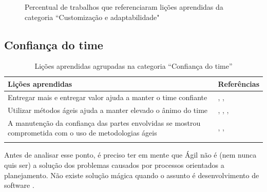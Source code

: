 \begin{figure}[H]
	\centering
	\captionsetup{justification=centering}
	\caption{Percentual de trabalhos que referenciaram lições aprendidas da categoria ``Customização e adaptabilidade"}
	\label{fig:adaptabilidade}
\end{figure}

\subsection{Confiança do time}

\begin{table}[H]
	\centering
	\captionsetup{justification=centering}
	\begin{tabularx}{\linewidth}{ | X | p{5cm} | } \hline \textbf{Lições aprendidas} & \textbf{Referências} \\ \hline
		Entregar mais e entregar valor  ajuda a manter o time confiante & \cite{Block2011}, \cite{Asnawi2012}, \cite{Parzinello2012} \\ \hline
		Utilizar métodos ágeis ajuda a manter elevado o ânimo do time & \cite{Asnawi2012}, \cite{Claudia2013}, \cite{Nokia2013}, \cite{Ahmed2008} \\ \hline
		A manutenção da confiança das partes envolvidas se mostrou comprometida com o uso de metodologias ágeis & \cite{Nokia2013}, \cite{Piegas2012}, \cite{Bastos2013} \\ \hline
	\caption{Lições aprendidas agrupadas na categoria ``Confiança do time''}
	\end{tabularx}
\end{table}

Antes de analisar esse ponto, é preciso ter em mente que Ágil não é (nem nunca quis ser) a solução dos problemas causados por processos orientados a planejamento. Não existe solução mágica quando o assunto é desenvolvimento de software \cite{Piegas2012,Microsoft2013}.

